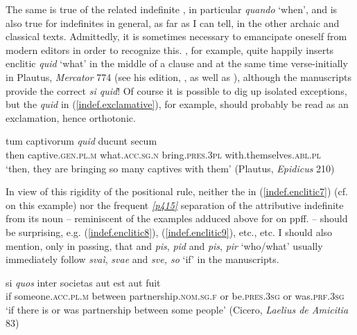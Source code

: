 The same is true of the related indefinite , in particular \emph{quando} `when', and is also true for indefinites in general, as far as I can tell, in the other archaic and classical texts. Admittedly, it is sometimes necessary to emancipate oneself from modern editors in order to recognize this. \citeauthor{Goetz1876}, for example, quite happily inserts enclitic \emph{quid} `what' in the middle of a clause and at the same time verse-initially in Plautus, \textit{Mercator} 774\label{mercator} (see his edition, \citealp[92]{RitschlGoetz1884}, as well as \citealp[244]{Goetz1876}), although the manuscripts provide the correct \emph{si quid}! Of course it is possible to dig up isolated exceptions, but the \emph{quid} in (\ref{indef.exclamative}), for example, should probably be read as an exclamation, hence orthotonic.

\begin{exe}
\ex
\gll tum captivorum \emph{quid} ducunt secum\\
then captive.\textsc{gen.pl.m} what.\textsc{acc.sg.n} bring.\textsc{pres.3pl} with.themselves.\textsc{abl.pl}\\
\trans `then, they are bringing so many captives with them' (Plautus, \textit{Epidicus} 210) 
\label{indef.exclamative}
\end{exe}

In view of this rigidity of the positional rule, neither the  in (\ref{indef.enclitic7}) (cf. \citealp{SeyffertMueller1876} on this example) nor the frequent \hyperlink{p415}{\emph{[p415]}} separation of the attributive indefinite from its noun -- reminiscent of the examples adduced above for  on pp\pageref{greekseparation}ff. -- should be surprising, e.g. (\ref{indef.enclitic8}), (\ref{indef.enclitic9}), etc., etc. I should also mention, only in passing, that  and  \emph{pis}, \emph{pid} and \emph{pis}, \emph{pir} `who/what' usually immediately follow \emph{svaì}, \emph{svae} and \emph{sve, so} `if' in the manuscripts.

\begin{exe}
\ex
\gll si \emph{quos} inter societas aut est aut fuit\\
if someone.\textsc{acc.pl.m} between partnership.\textsc{nom.sg.f} or be.\textsc{pres.3sg} or was.\textsc{prf.3sg}\\
\trans `if there is or was partnership between some people' (Cicero, \textit{Laelius de Amicitia} 83) 
\label{indef.enclitic7}
\end{exe}

